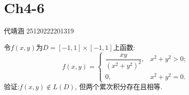 \documentclass[../main.tex]{subfiles}
\begin{document}
\ifSubfilesClassLoaded{

    
    \setcounter{chapter}{3}
}{}

\chapter{ Ch4-6 }
 代靖涵 25120222201319
\begin{exercise}{}{}
    令\(f(x,y)\)为\(D=[-1,1]\times[-1,1]\)上函数:
\[
f(x,y)=
\begin{cases}
\dfrac{xy}{(x^{2}+y^{2})^{2}}, & x^{2}+y^{2}>0;\\[4pt]
0, & x^{2}+y^{2}=0.
\end{cases}
\]
验证:\(f(x,y)\notin L(D)\), 但两个累次积分存在且相等.
\end{exercise}
\end{document}
